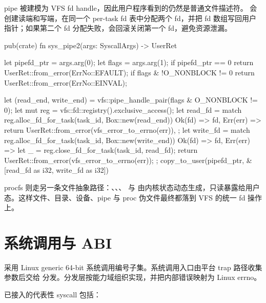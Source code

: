 pipe 被建模为 VFS fd handle，因此用户程序看到的仍然是普通文件描述符。 会创建读端和写端，在同一个 per-task fd 表中分配两个 fd，并把 fd 数组写回用户指针；如果第二个 fd 分配失败，会回滚关闭第一个 fd，避免资源泄漏。

\begin{rustcode}
pub(crate) fn sys_pipe2(args: SyscallArgs) -> UserRet {
    let pipefd_ptr = args.arg(0);
    let flags = args.arg(1);
    if pipefd_ptr == 0 { return UserRet::from_error(ErrNo::EFAULT); }
    if flags & !O_NONBLOCK != 0 { return UserRet::from_error(ErrNo::EINVAL); }

    let (read_end, write_end) = vfs::pipe_handle_pair(flags & O_NONBLOCK != 0);
    let mut reg = vfs::fd::registry().exclusive_access();
    let read_fd = match reg.alloc_fd_for_task(task_id, Box::new(read_end)) {
        Ok(fd) => fd,
        Err(err) => return UserRet::from_error(vfs_error_to_errno(err)),
    };
    let write_fd = match reg.alloc_fd_for_task(task_id, Box::new(write_end)) {
        Ok(fd) => fd,
        Err(err) => {
            let _ = reg.close_fd_for_task(task_id, read_fd);
            return UserRet::from_error(vfs_error_to_errno(err));
        }
    };
    copy_to_user(pipefd_ptr, &[read_fd as i32, write_fd as i32])
}
\end{rustcode}

procfs 则走另一条文件抽象路径：、、、 与  由内核状态动态生成，只读暴露给用户态。这样文件、目录、设备、pipe 与 proc 伪文件最终都落到 VFS 的统一 fd 操作上。

\section{系统调用与 ABI}

 采用 Linux generic 64-bit 系统调用编号子集。系统调用入口由平台 trap 路径收集参数后交给  分发。分发层按能力域组织实现，并把内部错误映射为 Linux errno。

已接入的代表性 syscall 包括：

